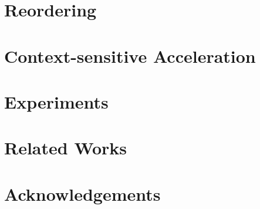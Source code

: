 \documentclass[pldi]{sigplanconf-pldi15}
\begin{document}
\section{Reordering}
\section{Context-sensitive Acceleration}
\section{Experiments}
\section{Related Works}
\section{Acknowledgements}



\begin{thebibliography}{}
\softraggedright
\end{thebibliography}
\end{document}
